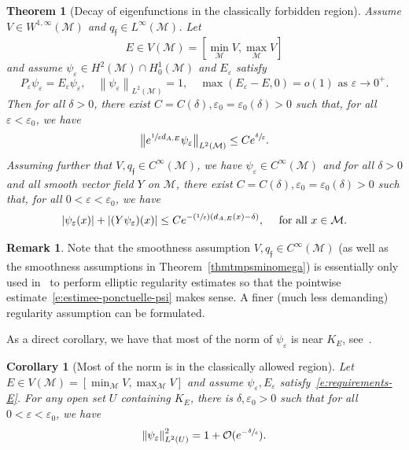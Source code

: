 \documentclass[JEP,XML,SOM,Unicode]{cedram}
\newcommand{\Psfrac}[2]{(\sfrac{#1}{#2})}
\newtheorem{theorem}[lemma]{Theorem}
\newtheorem{corollary}[lemma]{Corollary}
\theoremstyle{definition}
\newtheorem{remark}[lemma]{Remark}
\newcommand{\M}{\ensuremath{\mathcal M}}
\newcommand\grandon[1]{\mathcal{O}(#1)}
\newcommand{\f}{\ensuremath{\mathfrak{f}}}
\newcommand\nor[2]{\left\|#1\right\|_{#2}}
\newcommand\bnor[2]{\bigl\|#1\bigr\|_{#2}}
\let\eps\varepsilon
\newcommand{\qf}{q_{\f}}
\begin{document}
\begin{theorem}[Decay of eigenfunctions in the classically forbidden region]
\label{t:decay-agmon}
Assume $V \in W^{1,\infty}(\M)$ and $\qf \in L^\infty(\M)$. Let
\[
E \in V(\M) = [\min_\M V, \max_\M V]
\]
and assume $\psi_\eps \in H^2(\M) \cap H^1_0(\M)$ and $E_\eps$ satisfy
\begin{equation}
\label{e:requirements-E}
P_\eps \psi_\eps = E_\eps \psi_\eps, \quad \nor{\psi_\eps}{L^2(\M)} = 1, \quad \max(E_\eps -E, 0) = o(1) \text{ as } \eps \to 0^+.
\end{equation}
Then for all $\delta>0$, there exist $C=C(\delta),\eps_0=\eps_0(\delta)>0$ such that, for all $\eps<\eps_0$, we have
\begin{equation}
\label{e:estimee-L2-psi}
\bnor{ e^{\sfrac{1}{\eps} d_{A,E}} \psi_\eps}{L^2(\M)}\leq C e^{\sfrac{\delta}{\eps}}.
\end{equation}
Assuming further that $V, \qf \in C^\infty(\M)$, we have $\psi_\eps \in C^\infty(\M)$ and for all $\delta>0$ and all smooth vector field $Y$ on $\M$, there exist $C=C(\delta),\eps_0=\eps_0(\delta)>0$ such that, for all $0<\eps<\eps_0$, we have
\begin{equation}
\label{e:estimee-ponctuelle-psi}
|\psi_\eps(x)| + |(Y\psi_\eps)(x)| \leq C e^{-\Psfrac{1}{\eps} (d_{A,E}(x)-\delta)}, \quad \text{ for all } x \in \M.
\end{equation}
\end{theorem}
\begin{remark}
\label{r:Cinfty-reg-bdry}
Note that the smoothness assumption $V, \qf \in C^\infty(\M)$ (as well as the smoothness assumptions in Theorem~\ref{thmtmpsminomega}) is essentially only used in~\cite{HS84,Helffer:booksemiclassic,DS:book} to perform elliptic regularity estimates so that the pointwise estimate~\eqref{e:estimee-ponctuelle-psi} makes sense. A finer (much less demanding) regularity assumption can be formulated.
\end{remark}

As a direct corollary, we have that most of the norm of $\psi_\eps$ is near $K_E$, see~\cite[Cor.\,3.3.2]{Helffer:booksemiclassic}.
\begin{corollary}[Most of the norm is in the classically allowed region]
\label{corpresx0omega}
Let $E \in V(\M) = [\min_\M V, \max_\M V]$ and assume $\psi_\eps, E_\eps$ satisfy~\eqref{e:requirements-E}.
For any open set $U$ containing $K_E$, there is $\delta, \eps_0 >0$ such that for all $0<\eps< \eps_0$, we have
\[
\nor{\psi_\eps}{L^2(U)}^2 = 1 + \grandon{e^{-\sfrac{\delta}{\eps}}}.
\]
\end{corollary}
\end{document}
